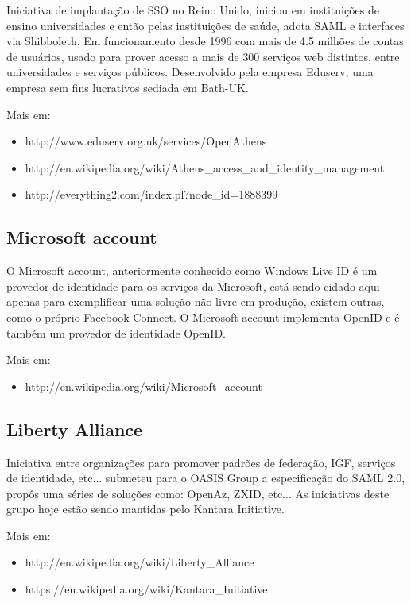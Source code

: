 \documentclass[11pt]{article}
\begin{document}
Iniciativa de implantação de SSO no Reino Unido, iniciou em instituições de
ensino universidades e então pelas instituições de saúde, adota SAML e
interfaces via Shibboleth. Em funcionamento desde 1996 com mais de 4.5 milhões
de contas de usuários, usado para prover acesso a mais de 300 serviços web
distintos, entre universidades e serviços públicos. Desenvolvido pela empresa
Eduserv, uma empresa sem fins lucrativos sediada em Bath-UK.

Mais em:
\begin{itemize}
  \item{http://www.eduserv.org.uk/services/OpenAthens}
  \item{http://en.wikipedia.org/wiki/Athens\_access\_and\_identity\_management}
  \item{http://everything2.com/index.pl?node\_id=1888399}
\end{itemize}

\subsection{Microsoft account}

O Microsoft account, anteriormente conhecido como Windows Live ID é um
provedor de identidade para os serviços da Microsoft, está sendo cidado aqui
apenas para exemplificar uma solução não-livre em produção, existem outras,
como o próprio Facebook Connect. O Microsoft account implementa OpenID e é
também um provedor de identidade OpenID.

Mais em:
\begin{itemize}
  \item{http://en.wikipedia.org/wiki/Microsoft\_account}
\end{itemize}

\subsection{Liberty Alliance}

Iniciativa entre organizações para promover padrões de federação, IGF,
serviços de identidade, etc... submeteu para o OASIS Group a especificação do
SAML 2.0, propôs uma séries de soluções como: OpenAz, ZXID, etc... As
iniciativas deste grupo hoje estão sendo mantidas pelo Kantara Initiative.

Mais em:
\begin{itemize}
  \item{http://en.wikipedia.org/wiki/Liberty\_Alliance}
  \item{https://en.wikipedia.org/wiki/Kantara\_Initiative}
\end{itemize}
\end{document}
